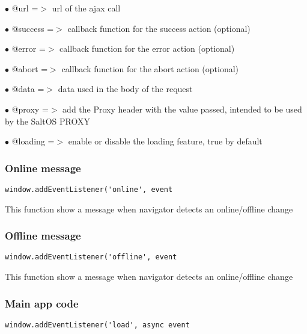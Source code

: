 \documentclass[a4paper]{article}
\begin{document}
\begin{compactitem}
\item[\color{myblue}$\bullet$] @url     =$>$ url of the ajax call
\item[\color{myblue}$\bullet$] @success =$>$ callback function for the success action (optional)
\item[\color{myblue}$\bullet$] @error   =$>$ callback function for the error action (optional)
\item[\color{myblue}$\bullet$] @abort   =$>$ callback function for the abort action (optional)
\item[\color{myblue}$\bullet$] @data    =$>$ data used in the body of the request
\item[\color{myblue}$\bullet$] @proxy   =$>$ add the Proxy header with the value passed, intended to be used by the SaltOS PROXY
\item[\color{myblue}$\bullet$] @loading =$>$ enable or disable the loading feature, true by default
\end{compactitem}

\hypertarget{toc578}{}
\subsubsection{Online message}

\begin{lstlisting}
window.addEventListener('online', event
\end{lstlisting}

This function show a message when navigator detects an online/offline change

\hypertarget{toc579}{}
\subsubsection{Offline message}

\begin{lstlisting}
window.addEventListener('offline', event
\end{lstlisting}

This function show a message when navigator detects an online/offline change

\hypertarget{toc580}{}
\subsubsection{Main app code}

\begin{lstlisting}
window.addEventListener('load', async event
\end{lstlisting}
\end{document}
